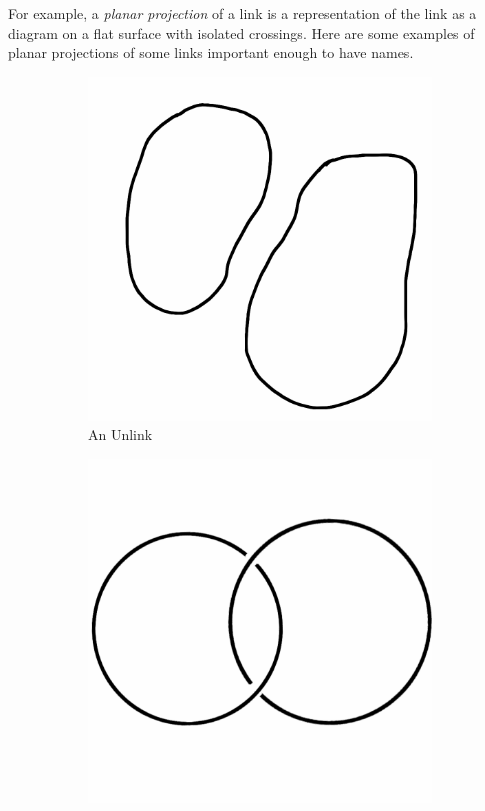 \documentclass[12pt,letterpaper]{article}
\theoremstyle{definition}
\begin{document}
For example, a \emph{planar projection} of a link is a representation of the link as a diagram on a flat surface with isolated crossings.
Here are some examples of planar projections of some links important enough to have names.

\begin{figure}[h]
    \centering
    \begin{subfigure}{.3\textwidth}
        \centering
        \includegraphics[width=\textwidth]{rgp10pics/unlink2.png}
        \caption{An Unlink}
    \end{subfigure}
    \quad
    \begin{subfigure}{.3\textwidth}
        \centering
        \includegraphics[width=\textwidth]{rgp10pics/hopf.png}

\end{subfigure}
\end{figure}
\end{document}
